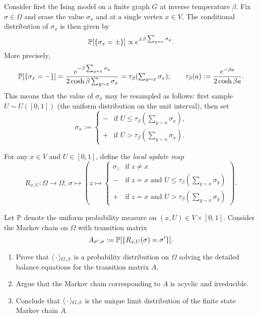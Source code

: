 Consider first the Ising model on a finite graph $G$ at inverse temperature $\beta$.
Fix $\sigma\in\Omega$ and erase the value $\sigma_x$ and at a single vertex $x\in V$.
The conditional distribution of $\sigma_x$ is then given by
\[
    \P[\{\sigma_x=\pm\}]\propto e^{\pm\beta \sum_{y\sim x}\sigma_y}.
\]
More precisely,
\[
    \P[\{\sigma_x=-\}]=\frac{e^{-\beta \sum_{y\sim x}\sigma_y}}{2\cosh\beta\sum_{y\sim x}\sigma_x}
    =\tau_\beta({\textstyle\sum_{y\sim x}\sigma_x});
    \qquad
    \tau_\beta(a):=\frac{e^{-\beta a}}{2\cosh\beta a}.
\]
This means that the value of $\sigma_x$ may be resampled as follows:
first sample $U\sim U([0,1])$ (the uniform distribution on the unit interval),
then set
\[
    \sigma_x:=\begin{cases}
        - &\text{if $U\leq \tau_\beta(\sum_{y\sim x}\sigma_x)$,}\\
        + &\text{if $U> \tau_\beta(\sum_{y\sim x}\sigma_x)$.}
    \end{cases}
\]

\begin{definition}
    For any $x\in V$ and $U\in[0,1]$, define the \emph{local update map}
    \[
        R_{x,U}:\Omega\to\Omega,\,\sigma\mapsto
        \left(
            z\mapsto \begin{cases}
                \sigma_z&\text{if $z\neq x$}\\
                - &\text{if $z=x$ and $U\leq \tau_\beta(\sum_{y\sim x}\sigma_y)$}\\
                + &\text{if $z=x$ and $U>\tau_\beta(\sum_{y\sim x}\sigma_y)$}
            \end{cases} 
        \right).
    \]
\end{definition}

Let $\P$ denote the uniform probability measure on $(x,U)\in V\times[0,1]$.
Consider the Markov chain on $\Omega$ with transition matrix
\[
    A_{\sigma',\sigma}:=\P[\{R_{x,U}(\sigma)=\sigma'\}].
\]

\begin{exercise}
    \begin{enumerate}
        \item     Prove that $\langle\blank\rangle_{G,\beta}$ is a probability distribution on
        $\Omega$ solving the detailed balance equations for the transition matrix $A$.
        \item Argue that the Markov chain corresponding to $A$ is acyclic and irreducible.
        \item Conclude that $\langle\blank\rangle_{G,\beta}$ is the unique limit distribution
        of the finite state Markov chain $A$.
    \end{enumerate}
\end{exercise}

